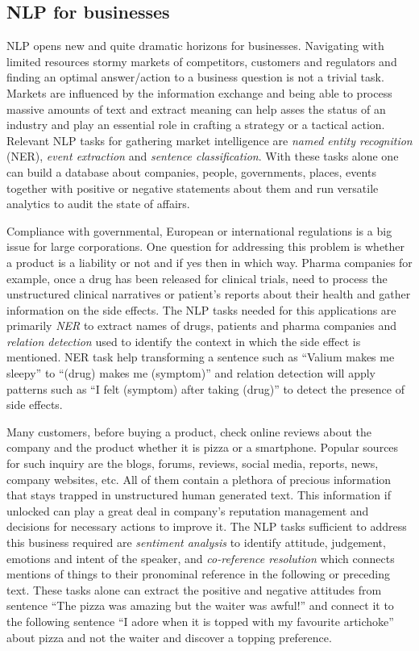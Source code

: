 \subsection{NLP for businesses}
NLP opens new and quite dramatic horizons for businesses. Navigating with limited resources stormy markets of competitors, customers and regulators and finding an optimal answer/action to a business question is not a trivial task. 
Markets are influenced by the information exchange and being able to process massive amounts of text and extract meaning can help asses the status of an industry and play an essential role in crafting a strategy or a tactical action. 
Relevant NLP tasks for gathering market intelligence are \textit{named entity recognition} (NER), \textit{event extraction} and \textit{sentence classification}. With these tasks alone one can build a database about companies, people, governments, places, events together with positive or negative statements about them and run versatile analytics to audit the state of affairs.

Compliance with governmental, European or international regulations is a big issue for large corporations. One question for addressing this problem is whether a product is a liability or not and if yes then in which way. Pharma companies for example, once a drug has been released for clinical trials, need to process the unstructured clinical narratives or patient's reports about their health and gather information on the side effects. The NLP tasks needed for this applications are primarily \textit{NER} to extract names of drugs, patients and pharma companies and \textit{relation detection} used to identify the context in which the side effect is mentioned. NER task help transforming a sentence such as ``Valium makes me sleepy'' to ``(drug) makes me (symptom)'' and relation detection will apply patterns such as ``I felt (symptom) after taking (drug)'' to detect the presence of side effects.

Many customers, before buying a product, check online reviews about the company and the product whether it is pizza or a smartphone. Popular sources for such inquiry are the blogs, forums, reviews, social media, reports, news, company websites, etc. All of them contain a plethora of precious information that stays trapped in unstructured human generated text. This information if unlocked can play a great deal in company's reputation management and decisions for necessary actions to improve it. The NLP tasks sufficient to address this business required are \textit{sentiment analysis} to identify attitude, judgement, emotions and intent of the speaker, and \textit{co-reference resolution} which connects mentions of things to their pronominal reference in the following or preceding text. These tasks alone can extract the positive and negative attitudes from sentence ``The pizza was amazing but the waiter was awful!'' and connect it to the following sentence ``I adore when it is topped with my favourite artichoke'' about pizza and not the waiter and discover a topping preference.

